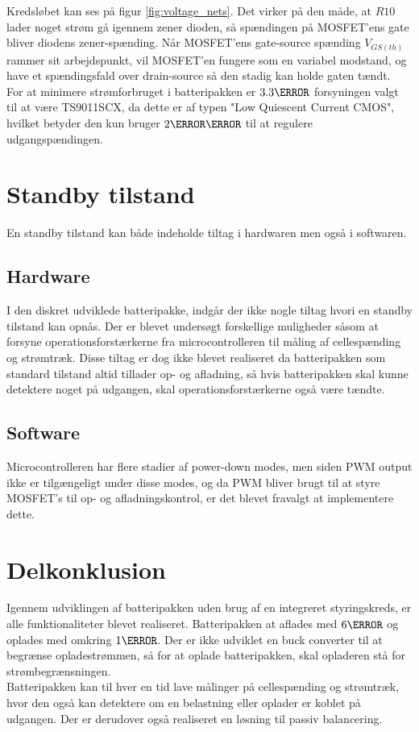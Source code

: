 Kredsløbet kan ses på figur \ref{fig:voltage_nets}. Det virker på den måde, at $R10$ lader noget strøm gå igennem zener dioden, så spændingen på MOSFET'ens gate bliver diodens zener-spænding. Når MOSFET'ens gate-source spænding $V_{GS(th)}$ rammer sit arbejdspunkt, vil MOSFET'en fungere som en variabel modstand, og have et spændingsfald over drain-source så den stadig kan holde gaten tændt.
\\

For at minimere strømforbruget i batteripakken er $3.3\volt$ forsyningen valgt til at være TS9011SCX, da dette er af typen "Low Quiescent Current CMOS", hvilket betyder den kun bruger $2\micro\ampere$ til at regulere udgangspændingen.

\section{Standby tilstand}
En standby tilstand kan både indeholde tiltag i hardwaren men også i softwaren.

\subsection{Hardware}
I den diskret udviklede batteripakke, indgår der ikke nogle tiltag hvori en standby tilstand kan opnås. Der er blevet undersøgt forskellige muligheder såsom at forsyne operationsforstærkerne fra microcontrolleren til måling af cellespænding og strømtræk. Disse tiltag er dog ikke blevet realiseret da batteripakken som standard tilstand altid tillader op- og afladning, så hvis batteripakken skal kunne detektere noget på udgangen, skal operationsforstærkerne også være tændte.

\subsection{Software}
Microcontrolleren har flere stadier af power-down modes, men siden PWM output ikke er tilgængeligt under disse modes, og da PWM bliver brugt til at styre MOSFET's til op- og afladningskontrol, er det blevet fravalgt at implementere dette. 

\section{Delkonklusion}
Igennem udviklingen af batteripakken uden brug af en integreret styringskreds, er alle funktionaliteter blevet realiseret. Batteripakken at aflades med $6\ampere$ og oplades med omkring $1\ampere$. Der er ikke udviklet en buck converter til at begrænse opladestrømmen, så for at oplade batteripakken, skal opladeren stå for strømbegrænsningen.
\\

Batteripakken kan til hver en tid lave målinger på cellespænding og strømtræk, hvor den også kan detektere om en belastning eller oplader er koblet på udgangen. Der er derudover også realiseret en løsning til passiv balancering.